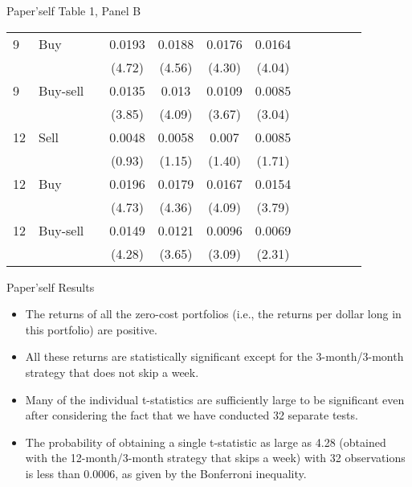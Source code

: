 \documentclass{beamer}
\begin{document}
\begin{frame}{Paper'self Table 1, Panel B}
\begin{table}
\begin{tabular}{llrSSSScSSSS}
			9  & Buy      &    & 0.0193                & 0.0188                & 0.0176                & 0.0164                 \\
			   &          &    & (4.72)                & (4.56)                & (4.30)                & (4.04)                 \\
			9  & Buy-sell &    & 0.0135                & 0.013                 & 0.0109                & 0.0085                 \\
			   &          &    & (3.85)                & (4.09)                & (3.67)                & (3.04)                 \\
			12 & Sell     &    & 0.0048                & 0.0058                & 0.007                 & 0.0085                 \\
			   &          &    & (0.93)                & (1.15)                & (1.40)                & (1.71)                 \\
			12 & Buy      &    & 0.0196                & 0.0179                & 0.0167                & 0.0154                 \\
			   &          &    & (4.73)                & (4.36)                & (4.09)                & (3.79)                 \\
			12 & Buy-sell &    & 0.0149                & 0.0121                & 0.0096                & 0.0069                 \\
			   &          &    & (4.28)                & (3.65)                & (3.09)                & (2.31)                 \\
			\bottomrule
		\end{tabular}
	\end{table}
\end{frame}

\begin{frame}{Paper'self Results}
	\begin{itemize}
		\item The returns of all the zero-cost portfolios (i.e., the returns per dollar long in this portfolio) are positive.
		\item All these returns are statistically significant except for the 3-month/3-month strategy that does not skip a week.
		\item Many of the individual t-statistics are sufficiently large to be significant even after considering the fact that we have conducted 32 separate tests.
		\item The probability of obtaining a single t-statistic as large as 4.28 (obtained with the 12-month/3-month strategy that skips a week) with 32 observations is less than 0.0006, as given by the Bonferroni inequality.
	\end{itemize}
\end{frame}
\end{document}
